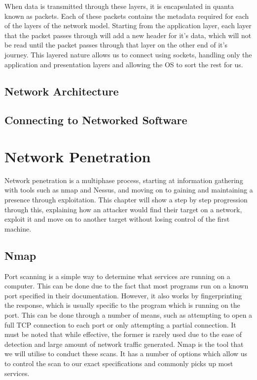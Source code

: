 \documentclass[a4paper,11pt]{report}
\begin{document}
		When data is transmitted through these layers, it is encapsulated in quanta known as packets. 
		Each of these packets contains the metadata required for each of the layers of the network model. 
		Starting from the application layer, each layer that the packet passes through will add a new header for it's data, which will not be read until the packet passes through that layer on the other end of it's journey. 
		This layered nature allows us to connect using sockets, handling only the application and presentation layers and allowing the OS to sort the rest for us. 
	\section{Network Architecture}
	\section{Connecting to Networked Software}
	
\chapter{Network Penetration}
	\label{ch:NetworkPenetration}
	Network penetration is a multiphase process, starting at information gathering with tools such as nmap and Nessus, and moving on to gaining and maintaining a presence through exploitation. 
	This chapter will show a step by step progression through this, explaining how an attacker would find their target on a network, exploit it and move on to another target without losing control of the first machine. 
	\section{Nmap}
		Port scanning is a simple way to determine what services are running on a computer. 
		This can be done due to the fact that most programs run on a known port specified in their documentation. 
		However, it also works by fingerprinting the response, which is usually specific to the program which is running on the port. 
		This can be done through a number of means, such as attempting to open a full TCP connection to each port or only attempting a partial connection. 
		It must be noted that while effective, the former is rarely used due to the ease of detection and large amount of network traffic generated. 
		Nmap\cite{NmapBook} is the tool that we will utilise to conduct these scans. 
		It has a number of options which allow us to control the scan to our exact specifications and commonly picks up most services.\cite{HackingAOE} 
\end{document}
